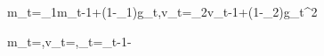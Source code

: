 m_t=\beta_1m_{t-1}+(1-\beta_1)g_t,\qquad v_t=\beta_2v_{t-1}+(1-\beta_2)g_t^2

\widehat m_t=,\quad\widehat v_t=,\quad\theta_t=\theta_{t-1}-
